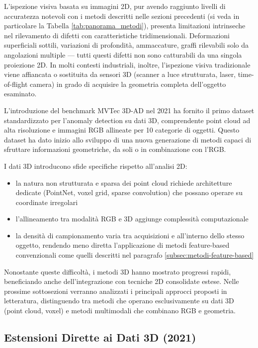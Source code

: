L'ispezione visiva basata su immagini 2D, pur avendo raggiunto livelli di accuratezza notevoli con i metodi descritti nelle sezioni precedenti (si veda in particolare la Tabella \ref{tab:panorama_metodi}), presenta limitazioni intrinseche nel rilevamento di difetti con caratteristiche tridimensionali. Deformazioni superficiali sottili, variazioni di profondità, ammaccature, graffi rilevabili solo da angolazioni multiple — tutti questi difetti non sono catturabili da una singola proiezione 2D. In molti contesti industriali, inoltre, l'ispezione visiva tradizionale viene affiancata o sostituita da sensori 3D (scanner a luce strutturata, laser, time-of-flight camera) in grado di acquisire la geometria completa dell'oggetto esaminato.

L'introduzione del benchmark MVTec 3D-AD \cite{bergmann2021mvtec3d} nel 2021 ha fornito il primo dataset standardizzato per l'anomaly detection su dati 3D, comprendente point cloud ad alta risoluzione e immagini RGB allineate per 10 categorie di oggetti. Questo dataset ha dato inizio allo sviluppo di una nuova generazione di metodi capaci di sfruttare informazioni geometriche, da soli o in combinazione con l'RGB.

I dati 3D introducono sfide specifiche rispetto all'analisi 2D:
\begin{itemize}
    \item la natura non strutturata e sparsa dei point cloud richiede architetture dedicate (PointNet, voxel grid, sparse convolution) che possano operare su coordinate irregolari
    \item l'allineamento tra modalità RGB e 3D aggiunge com\-ples\-si\-tà com\-pu\-ta\-zio\-na\-le
    \item la densità di campionamento varia tra acquisizioni e all'interno dello stesso oggetto, rendendo meno diretta l'applicazione di metodi feature-based convenzionali come quelli descritti nel paragrafo \ref{subsec:metodi-feature-based}
\end{itemize}

Nonostante queste difficoltà, i metodi 3D hanno mostrato progressi rapidi, beneficiando anche dell'integrazione con tecniche 2D consolidate estese. Nelle prossime sottosezioni verranno analizzati i principali approcci proposti in letteratura, distinguendo tra metodi che operano esclusivamente su dati 3D (point cloud, voxel) e metodi multimodali che combinano RGB e geometria.

\subsection{Estensioni Dirette ai Dati 3D (2021)}
\label{subsec:metodi-3d-voxel}

